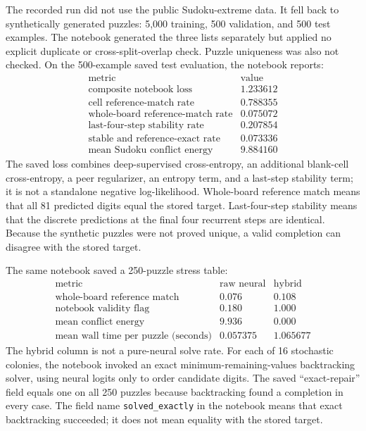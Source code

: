 \documentclass[11pt,oneside]{book}
\theoremstyle{remark}
\begin{document}
The recorded run did not use the public Sudoku-extreme data. It fell back to
synthetically generated puzzles: 5,000 training, 500 validation, and 500 test
examples. The notebook generated the three lists separately but applied no
explicit duplicate or cross-split-overlap check. Puzzle uniqueness was also
not checked. On the 500-example saved test evaluation, the notebook reports:
\[
\begin{array}{l|r}
\text{metric}&\text{value}\\
\hline
\text{composite notebook loss}&1.233612\\
\text{cell reference-match rate}&0.788355\\
\text{whole-board reference-match rate}&0.075072\\
\text{last-four-step stability rate}&0.207854\\
\text{stable and reference-exact rate}&0.073336\\
\text{mean Sudoku conflict energy}&9.884160
\end{array}
\]
The saved loss combines deep-supervised cross-entropy, an additional
blank-cell cross-entropy, a peer regularizer, an entropy term, and a
last-step stability term; it is not a standalone negative log-likelihood.
Whole-board reference match means that all 81 predicted digits equal the
stored target. Last-four-step stability means that the discrete predictions
at the final four recurrent steps are identical. Because the synthetic
puzzles were not proved unique, a valid completion can disagree with the
stored target.

The same notebook saved a 250-puzzle stress table:
\[
\begin{array}{l|rr}
\text{metric}&\text{raw neural}&\text{hybrid}\\
\hline
\text{whole-board reference match}&0.076&0.108\\
\text{notebook validity flag}&0.180&1.000\\
\text{mean conflict energy}&9.936&0.000\\
\text{mean wall time per puzzle (seconds)}&0.057375&1.065677
\end{array}
\]
The hybrid column is not a pure-neural solve rate. For each of 16 stochastic
colonies, the notebook invoked an exact minimum-remaining-values backtracking
solver, using neural logits only to order candidate digits. The saved
``exact-repair'' field equals one on all 250 puzzles because backtracking found
a completion in every case. The field name \texttt{solved\_exactly} in the
notebook means that exact backtracking succeeded; it does not mean equality
with the stored target.
\end{document}
